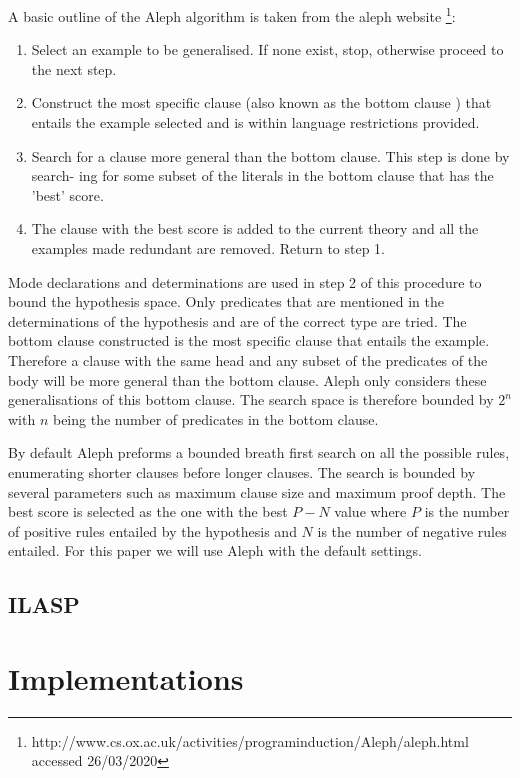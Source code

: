 \documentclass[a4paper,12pt]{report}
\begin{document}
A basic outline of the Aleph algorithm is taken from the aleph website \footnote{http://www.cs.ox.ac.uk/activities/programinduction/Aleph/aleph.html accessed 26/03/2020}:
\begin{enumerate}
\item Select an example to be generalised. If none exist, stop, otherwise proceed to the
next step.
\item Construct the most specific clause (also known as the bottom clause \cite{Muggleton/Aleph}) that entails
the example selected and is within language restrictions provided.
\item Search for a clause more general than the bottom clause. This step is done by search-
ing for some subset of the literals in the bottom clause that has the 'best' score.
\item The clause with the best score is added to the current theory and all the examples
made redundant are removed. Return to step 1.
\end{enumerate}

Mode declarations and determinations are used in step 2 of this procedure to bound the hypothesis space. Only predicates that are mentioned in the determinations of the hypothesis and are of the correct type are tried. The bottom clause constructed is the most specific clause that entails the example. Therefore a clause with the same head and any subset of the predicates of the body will be more general than the bottom clause. Aleph only considers these generalisations of this bottom clause. The search space is therefore bounded by $2^n$ with $n$ being the number of predicates in the bottom clause.

By default Aleph preforms a bounded breath first search on all the possible rules, enumerating shorter clauses before longer clauses. The search is bounded by several parameters such as maximum clause size and maximum proof depth. The best score is selected as the one with the best $P - N$ value where $P$ is the number of positive rules entailed by the hypothesis and $N$ is the number of negative rules entailed. For this paper we will use Aleph with the default settings.

\section{ILASP}
\chapter{Implementations}
\end{document}
